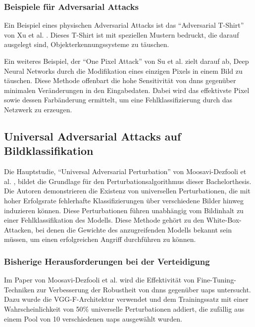 \newpage

\subsubsection{Beispiele für Adversarial Attacks} 
Ein Beispiel eines physischen Adversarial Attacks ist das ``Adversarial T-Shirt'' von Xu et al. \cite{xu_adversarial_2020}. Dieses T-Shirt ist mit speziellen Mustern bedruckt, die darauf ausgelegt sind, Objekterkennungssysteme zu täuschen. 

Ein weiteres Beispiel, der ``One Pixel Attack'' von Su et al. \cite{su_one_2019} zielt darauf ab, Deep Neural Networks durch die Modifikation eines einzigen Pixels in einem Bild zu täuschen. Diese Methode offenbart die hohe Sensitivität von \acrlong{dnn}s gegenüber minimalen Veränderungen in den Eingabedaten. Dabei wird das effektivste Pixel sowie dessen Farbänderung ermittelt, um eine Fehlklassifizierung durch das Netzwerk zu erzeugen. 

\subsection{Universal Adversarial Attacks auf Bildklassifikation} \label{chap:Universal Adversarial Attacks auf Bildklassifikation}
Die Hauptstudie, ``Universal Adversarial Perturbation'' von Moosavi-Dezfooli et al. \cite{moosavi-dezfooli_universal_2017}, bildet die Grundlage für den Perturbationsalgorithmus dieser Bachelorthesis. Die Autoren demonstrieren die Existenz von universellen Perturbationen, die mit hoher Erfolgsrate fehlerhafte Klassifizierungen über verschiedene Bilder hinweg induzieren können. Diese Perturbationen führen unabhängig vom Bildinhalt zu einer Fehlklassifikation des Modells. Diese Methode gehört zu den White-Box-Attacken, bei denen die Gewichte des anzugreifenden Modells bekannt sein müssen, um einen erfolgreichen Angriff durchführen zu können.

\subsubsection{Bisherige Herausforderungen bei der Verteidigung}
Im Paper von Moosavi-Dezfooli et al. \cite{moosavi-dezfooli_universal_2017} wird die Effektivität von Fine-Tuning-Techniken zur Verbesserung der Robustheit von \acrlong{dnn}s gegenüber \acrlong{uap}s untersucht. Dazu wurde die VGG-F-Architektur verwendet und dem Trainingssatz mit einer Wahrscheinlichkeit von 50\% universelle Perturbationen addiert, die zufällig aus einem Pool von 10 verschiedenen \acrshort{uap}s ausgewählt wurden.

